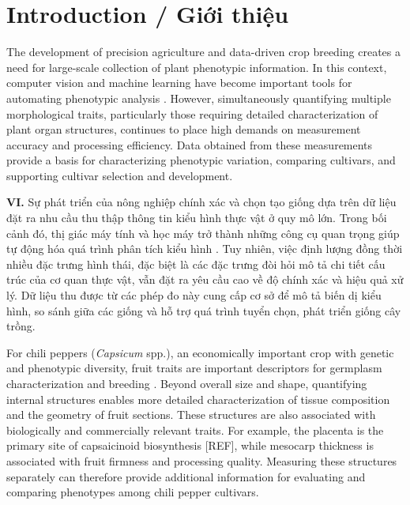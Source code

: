 \documentclass[final,1p,11pt,longtitle]{elsarticle}
\newenvironment{viet}{\par\smallskip\begingroup\color{viColor}\noindent\textbf{VI. }\ignorespaces}{\par\endgroup\smallskip}
\begin{document}
\section{Introduction / {\color{viColor} Giới thiệu}}

The development of precision agriculture and data-driven crop breeding creates a need for large-scale collection of plant phenotypic information. In this context, computer vision and machine learning have become important tools for automating phenotypic analysis \cite{CV, ML}. However, simultaneously quantifying multiple morphological traits, particularly those requiring detailed characterization of plant organ structures, continues to place high demands on measurement accuracy and processing efficiency. Data obtained from these measurements provide a basis for characterizing phenotypic variation, comparing cultivars, and supporting cultivar selection and development.

\begin{viet}
Sự phát triển của nông nghiệp chính xác và chọn tạo giống dựa trên dữ liệu đặt ra nhu cầu thu thập thông tin kiểu hình thực vật ở quy mô lớn. Trong bối cảnh đó, thị giác máy tính và học máy trở thành những công cụ quan trọng giúp tự động hóa quá trình phân tích kiểu hình \cite{CV, ML}. Tuy nhiên, việc định lượng đồng thời nhiều đặc trưng hình thái, đặc biệt là các đặc trưng đòi hỏi mô tả chi tiết cấu trúc của cơ quan thực vật, vẫn đặt ra yêu cầu cao về độ chính xác và hiệu quả xử lý. Dữ liệu thu được từ các phép đo này cung cấp cơ sở để mô tả biến dị kiểu hình, so sánh giữa các giống và hỗ trợ quá trình tuyển chọn, phát triển giống cây trồng.
\end{viet}


For chili peppers (\textit{Capsicum} spp.), an economically important crop with genetic and phenotypic diversity, fruit traits are important descriptors for germplasm characterization and breeding \cite{tripodi}. Beyond overall size and shape, quantifying internal structures enables more detailed characterization of tissue composition and the geometry of fruit sections. These structures are also associated with biologically and commercially relevant traits. For example, the placenta is the primary site of capsaicinoid biosynthesis [REF], while mesocarp thickness is associated with fruit firmness and processing quality. Measuring these structures separately can therefore provide additional information for evaluating and comparing phenotypes among chili pepper cultivars.
\end{document}
